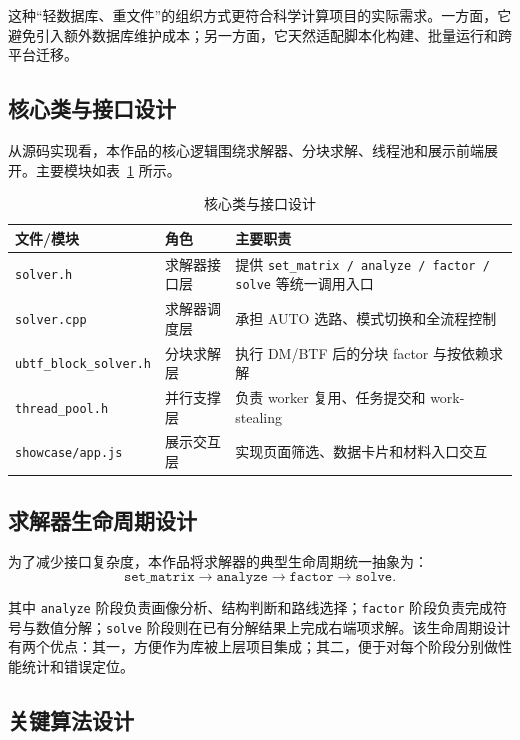 \documentclass[12pt,a4paper,fontset=none]{ctexart}
\begin{document}
这种“轻数据库、重文件”的组织方式更符合科学计算项目的实际需求。一方面，它避免引入额外数据库维护成本；另一方面，它天然适配脚本化构建、批量运行和跨平台迁移。

\subsection{核心类与接口设计}

从源码实现看，本作品的核心逻辑围绕求解器、分块求解、线程池和展示前端展开。主要模块如表~\ref{tab:interfaces} 所示。

\begin{table}[H]
\centering
\caption{核心类与接口设计}
\label{tab:interfaces}
\begin{tabular}{p{4.2cm}p{3.6cm}p{4.2cm}}
\toprule
文件/模块 & 角色 & 主要职责 \\
\midrule
\texttt{solver.h} & 求解器接口层 & 提供 \texttt{set\_matrix / analyze / factor / solve} 等统一调用入口 \\
\texttt{solver.cpp} & 求解器调度层 & 承担 AUTO 选路、模式切换和全流程控制 \\
\texttt{ubtf\_block\_solver.h} & 分块求解层 & 执行 DM/BTF 后的分块 factor 与按依赖求解 \\
\texttt{thread\_pool.h} & 并行支撑层 & 负责 worker 复用、任务提交和 work-stealing \\
\texttt{showcase/app.js} & 展示交互层 & 实现页面筛选、数据卡片和材料入口交互 \\
\bottomrule
\end{tabular}
\end{table}

\subsection{求解器生命周期设计}

为了减少接口复杂度，本作品将求解器的典型生命周期统一抽象为：
\begin{equation}
\texttt{set\_matrix} \rightarrow \texttt{analyze} \rightarrow \texttt{factor} \rightarrow \texttt{solve}.
\end{equation}

其中 \texttt{analyze} 阶段负责画像分析、结构判断和路线选择；\texttt{factor} 阶段负责完成符号与数值分解；\texttt{solve} 阶段则在已有分解结果上完成右端项求解。该生命周期设计有两个优点：其一，方便作为库被上层项目集成；其二，便于对每个阶段分别做性能统计和错误定位。

\subsection{关键算法设计}
\end{document}

